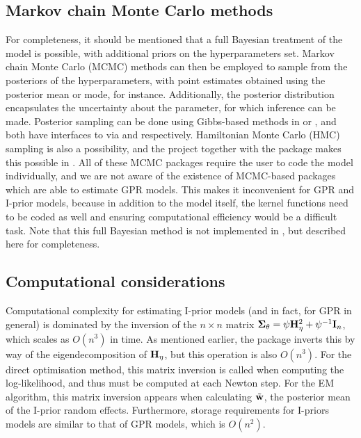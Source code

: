 \subsection{Markov chain Monte Carlo methods}

For completeness, it should be mentioned that a full Bayesian treatment of the model is possible, with additional priors on the hyperparameters set.
Markov chain Monte Carlo (MCMC) methods can then be employed to sample from the posteriors of the hyperparameters, with point estimates obtained using the posterior mean or mode, for instance.
Additionally, the posterior distribution encapsulates the uncertainty about the parameter, for which inference can be made.
Posterior sampling can be done using Gibbs-based methods in  \citep{lunn2000winbugs} or  \citep{plummer2003jags}, and both have interfaces to  via  \citep{sturtz2005r2winbugs} and  \citep{denwood2016runjags} respectively.
Hamiltonian Monte Carlo (HMC) sampling is also a possibility, and the  project \citep{carpenter2016stan} together with the package  \citep{rstan}  makes this possible in .
All of these MCMC packages require the user to code the model individually, and we are not aware of the existence of MCMC-based packages which are able to estimate GPR models.
This makes it inconvenient for GPR and I-prior models, because in addition to the model itself, the kernel functions need to be coded as well and ensuring computational efficiency would be a difficult task.
Note that this full Bayesian method is not implemented in , but described here for completeness.

\subsection{Computational considerations}

Computational complexity for estimating I-prior models (and in fact, for GPR in general) is dominated by the inversion of the $n \times n$ matrix ${\bm\Sigma}_\theta = \psi{\mathbf H}_\eta^2 + \psi^{-1}{\mathbf I}_n$, which scales as $O(n^3)$ in time.
As mentioned earlier, the  package inverts this by way of the eigendecomposition of ${\mathbf H}_\eta$, but this operation is also $O(n^3)$.
For the direct optimisation method, this matrix inversion is called when computing the log-likelihood, and thus must be computed at each Newton step.
For the EM algorithm, this matrix inversion appears when calculating $\tilde {{\mathbf w}}$, the posterior mean of the I-prior random effects.
Furthermore, storage requirements for I-priors models are similar to that of GPR models, which is $O(n^2)$.

